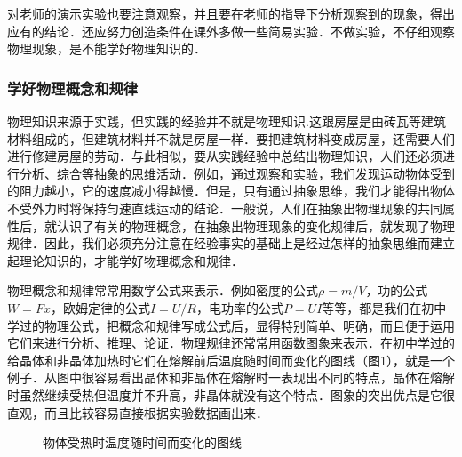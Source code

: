 对老师的演示实验也要注意观察，并且要在老师的指导下分析观察到的现象，得出应有的结论．还应努力创造条件在课外多做一些简易实验．不做实验，不仔细观察物理现象，是不能学好物理知识的．


\subsubsection{学好物理概念和规律}

物理知识来源于实践，但实践的经验并不就是物理知识.这跟房屋是由砖瓦等建筑材料组成的，但建筑材料并不就是房屋一样．要把建筑材料变成房屋，还需要人们进行修建房屋的劳动．与此相似，要从实践经验中总结出物理知识，人们还必须进行分析、综合等抽象的思维活动．例如，通过观察和实验，我们发现运动物体受到的阻力越小，它的速度减小得越慢．但是，只有通过抽象思维，我们才能得出物体不受外力时将保持匀速直线运动的结论．一般说，人们在抽象出物理现象的共同属性后，就认识了有关的物理概念，在抽象出物理现象的变化规律后，就发现了物理规律．因此，我们必须充分注意在经验事实的基础上是经过怎样的抽象思维而建立起理论知识的，才能学好物理概念和规律．

物理概念和规律常常用数学公式来表示．例如密度的公式$\rho=m/V$，功的公式$W=Fx$，欧姆定律的公式$I=U/R$，电功率的公式$P=UI$等等，都是我们在初中学过的物理公式，把概念和规律写成公式后，显得特别简单、明确，而且便于运用它们来进行分析、推理、论证．物理规律还常常用函数图象来表示．在初中学过的给晶体和非晶体加热时它们在熔解前后温度随时间而变化的图线（图1），就是一个例子．从图中很容易看出晶体和非晶体在熔解时一表现出不同的特点，晶体在熔解时虽然继续受热但温度并不升高，非晶体就没有这个特点．图象的突出优点是它很直观，而且比较容易直接根据实验数据画出来．

\begin{figure}[htpb]
    \centering
    \qquad\qquad
    \caption{物体受热时温度随时间而变化的图线}
\end{figure}



